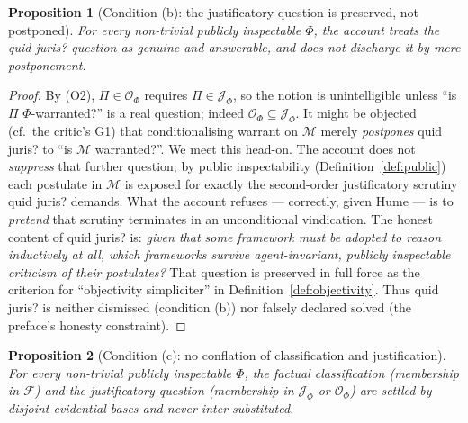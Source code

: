 \documentclass{amsart}
\theoremstyle{definition}
\theoremstyle{plain}
\newtheorem{proposition}{Proposition}
\theoremstyle{remark}
\begin{document}
\begin{proposition}[Condition (b): the justificatory question is preserved,
not postponed]\label{prop:b}
For every non-trivial publicly inspectable $\Phi$, the account treats the quid
juris? question as genuine and answerable, and does not discharge it by mere
postponement.
\end{proposition}

\begin{proof}
By (O2), $\Pi\in\mathcal{O}_\Phi$ requires $\Pi\in\mathcal{J}_\Phi$, so the
notion is unintelligible unless ``is $\Pi$ $\Phi$-warranted?'' is a real
question; indeed $\mathcal{O}_\Phi\subseteq\mathcal{J}_\Phi$. It might be
objected (cf.\ the critic's G1) that conditionalising warrant on $\mathcal{M}$
merely \emph{postpones} quid juris? to ``is $\mathcal{M}$ warranted?''. We meet
this head-on. The account does not \emph{suppress} that further question; by
public inspectability (Definition~\ref{def:public}) each postulate in
$\mathcal{M}$ is exposed for exactly the second-order justificatory scrutiny
quid juris? demands. What the account refuses --- correctly, given Hume --- is
to \emph{pretend} that scrutiny terminates in an unconditional vindication. The
honest content of quid juris? is: \emph{given that some framework must be
adopted to reason inductively at all, which frameworks survive agent-invariant,
publicly inspectable criticism of their postulates?} That question is preserved
in full force as the criterion for ``objectivity simpliciter'' in
Definition~\ref{def:objectivity}. Thus quid juris? is neither dismissed
(condition (b)) nor falsely declared solved (the preface's honesty
constraint).
\end{proof}

\begin{proposition}[Condition (c): no conflation of classification and
justification]\label{prop:c}
For every non-trivial publicly inspectable $\Phi$, the factual classification
(membership in $\mathcal{F}$) and the justificatory question (membership in
$\mathcal{J}_\Phi$ or $\mathcal{O}_\Phi$) are settled by disjoint evidential
bases and never inter-substituted.
\end{proposition}
\end{document}
